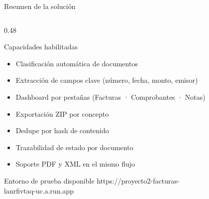 \documentclass[aspectratio=169]{beamer}
\begin{document}
\begin{frame}{Resumen de la solución}
\begin{columns}[T]
\begin{column}{0.48\textwidth}
  \begin{exampleblock}{Capacidades habilitadas}
    \begin{itemize}
      \item[\faCheckCircle] Clasificación automática de documentos
      \item[\faCheckCircle] Extracción de campos clave (número, fecha, monto, emisor)
      \item[\faCheckCircle] Dashboard por pestañas (Facturas · Comprobantes · Notas)
      \item[\faCheckCircle] Exportación ZIP por concepto
      \item[\faCheckCircle] Dedupe por hash de contenido
      \item[\faCheckCircle] Trazabilidad de estado por documento
      \item[\faCheckCircle] Soporte PDF y XML en el mismo flujo
    \end{itemize}
  \end{exampleblock}

  \vspace{0.3cm}

  \begin{alertblock}{Entorno de prueba disponible}
    \tiny\ttfamily https://proyecto2-facturas-\\lanrfivtaq-uc.a.run.app
  \end{alertblock}
\end{column}
\end{columns}
\end{frame}
\end{document}

